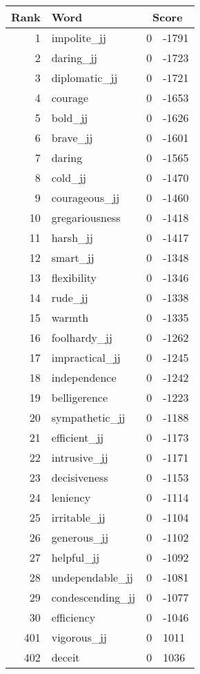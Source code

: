 \begin{longtable}[!htbp]{| rlr@{.}l |}
    \hline
    \textbf{Rank} & \textbf{Word} & \multicolumn{2}{c|}{\textbf{Score}} \\
    \hline
    \endhead
    1 & impolite\_jj & 0 & -1791 \\
    2 & daring\_jj & 0 & -1723 \\
    3 & diplomatic\_jj & 0 & -1721 \\
    4 & courage & 0 & -1653 \\
    5 & bold\_jj & 0 & -1626 \\
    6 & brave\_jj & 0 & -1601 \\
    7 & daring & 0 & -1565 \\
    8 & cold\_jj & 0 & -1470 \\
    9 & courageous\_jj & 0 & -1460 \\
    10 & gregariousness & 0 & -1418 \\
    11 & harsh\_jj & 0 & -1417 \\
    12 & smart\_jj & 0 & -1348 \\
    13 & flexibility & 0 & -1346 \\
    14 & rude\_jj & 0 & -1338 \\
    15 & warmth & 0 & -1335 \\
    16 & foolhardy\_jj & 0 & -1262 \\
    17 & impractical\_jj & 0 & -1245 \\
    18 & independence & 0 & -1242 \\
    19 & belligerence & 0 & -1223 \\
    20 & sympathetic\_jj & 0 & -1188 \\
    21 & efficient\_jj & 0 & -1173 \\
    22 & intrusive\_jj & 0 & -1171 \\
    23 & decisiveness & 0 & -1153 \\
    24 & leniency & 0 & -1114 \\
    25 & irritable\_jj & 0 & -1104 \\
    26 & generous\_jj & 0 & -1102 \\
    27 & helpful\_jj & 0 & -1092 \\
    28 & undependable\_jj & 0 & -1081 \\
    29 & condescending\_jj & 0 & -1077 \\
    30 & efficiency & 0 & -1046 \\
    401 & vigorous\_jj & 0 & 1011 \\
    402 & deceit & 0 & 1036 \\

\end{longtable}
